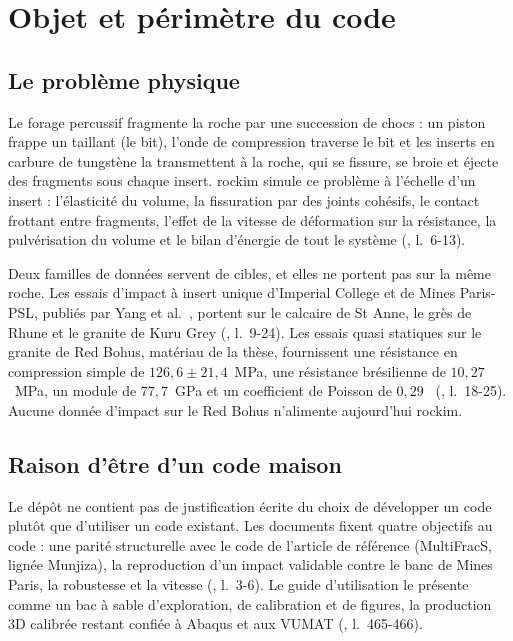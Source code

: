\section{Objet et périmètre du code}
\label{sec-objet}

\subsection{Le problème physique}

Le forage percussif fragmente la roche par une succession de chocs : un piston frappe un taillant (le bit), l'onde de compression traverse le bit et les inserts en carbure de tungstène la transmettent à la roche, qui se fissure, se broie et éjecte des fragments sous chaque insert. rockim simule ce problème à l'échelle d'un insert : l'élasticité du volume, la fissuration par des joints cohésifs, le contact frottant entre fragments, l'effet de la vitesse de déformation sur la résistance, la pulvérisation du volume et le bilan d'énergie de tout le système (, l.~6-13).

Deux familles de données servent de cibles, et elles ne portent pas sur la même roche. Les essais d'impact à insert unique d'Imperial College et de Mines Paris-PSL, publiés par Yang et al.~\cite{yang2025validation,yang2026pulverisation}, portent sur le calcaire de St Anne, le grès de Rhune et le granite de Kuru Grey (, l.~9-24). Les essais quasi statiques sur le granite de Red Bohus, matériau de la thèse, fournissent une résistance en compression simple de $126{,}6 \pm 21{,}4$~MPa, une résistance brésilienne de $10{,}27$~MPa, un module de $77{,}7$~GPa et un coefficient de Poisson de $0{,}29$~\cite{dumoulin2024data} (, l.~18-25). Aucune donnée d'impact sur le Red Bohus n'alimente aujourd'hui rockim.

\subsection{Raison d'être d'un code maison}

Le dépôt ne contient pas de justification écrite du choix de développer un code plutôt que d'utiliser un code existant. Les documents fixent quatre objectifs au code : une parité structurelle avec le code de l'article de référence (MultiFracS, lignée Munjiza), la reproduction d'un impact validable contre le banc de Mines Paris, la robustesse et la vitesse (, l.~3-6). Le guide d'utilisation le présente comme un bac à sable d'exploration, de calibration et de figures, la production 3D calibrée restant confiée à Abaqus et aux VUMAT (, l.~465-466).

